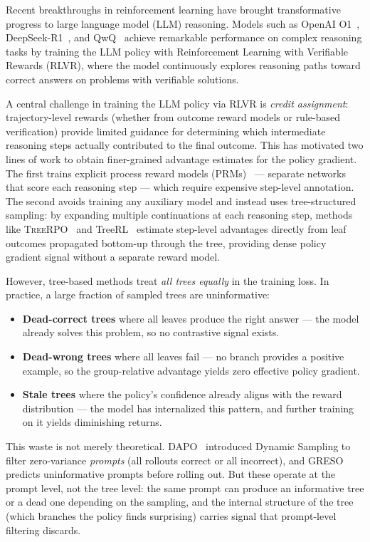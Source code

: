 \documentclass{article} %
\newcommand{\TreeRPO}{\textsc{TreeRPO}}
\begin{document}
Recent breakthroughs in reinforcement learning have brought transformative progress to large language model (LLM) reasoning. Models such as OpenAI O1~\citep{o1}, DeepSeek-R1~\citep{guo2025deepseek}, and QwQ~\citep{qwq} achieve remarkable performance on complex reasoning tasks by training the LLM policy with Reinforcement Learning with Verifiable Rewards (RLVR), where the model continuously explores reasoning paths toward correct answers on problems with verifiable solutions.

A central challenge in training the LLM policy via RLVR is \emph{credit assignment}: trajectory-level rewards (whether from outcome reward models or rule-based verification) provide limited guidance for determining which intermediate reasoning steps actually contributed to the final outcome. This has motivated two lines of work to obtain finer-grained advantage estimates for the policy gradient. The first trains explicit process reward models (PRMs)~\citep{verify_stepbystep, mathshepherd, omegaprm} --- separate networks that score each reasoning step --- which require expensive step-level annotation. The second avoids training any auxiliary model and instead uses tree-structured sampling: by expanding multiple continuations at each reasoning step, methods like \TreeRPO~\citep{treerpo} and TreeRL~\citep{treerl} estimate step-level advantages directly from leaf outcomes propagated bottom-up through the tree, providing dense policy gradient signal without a separate reward model.

However, tree-based methods treat \emph{all trees equally} in the training loss. In practice, a large fraction of sampled trees are uninformative:
\begin{itemize}
    \item \textbf{Dead-correct trees} where all leaves produce the right answer --- the model already solves this problem, so no contrastive signal exists.
    \item \textbf{Dead-wrong trees} where all leaves fail --- no branch provides a positive example, so the group-relative advantage yields zero effective policy gradient.
    \item \textbf{Stale trees} where the policy's confidence already aligns with the reward distribution --- the model has internalized this pattern, and further training on it yields diminishing returns.
\end{itemize}

This waste is not merely theoretical. DAPO~\citep{dapo} introduced Dynamic Sampling to filter zero-variance \emph{prompts} (all rollouts correct or all incorrect), and GRESO~\citep{greso} predicts uninformative prompts before rolling out. But these operate at the prompt level, not the tree level: the same prompt can produce an informative tree or a dead one depending on the sampling, and the internal structure of the tree (which branches the policy finds surprising) carries signal that prompt-level filtering discards.
\end{document}

